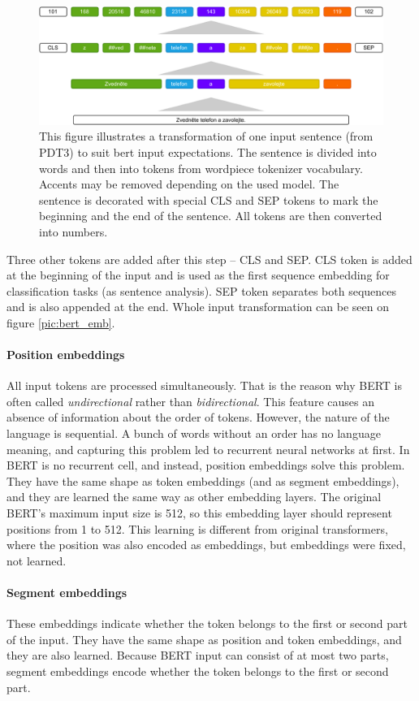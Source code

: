 \begin{figure}[ht]
\centering
\includegraphics[width=1\columnwidth]{../img/bert_input}
\protect\caption{This figure illustrates a transformation of one input sentence (from PDT3) to suit bert input expectations. The sentence is divided into words and then into tokens from wordpiece tokenizer vocabulary. Accents may be removed depending on the used model. The sentence is decorated with special CLS and SEP tokens to mark the beginning and the end of the sentence. All tokens are then converted into numbers. }
\label{pic:bert_inp}
\end{figure}
\par
Three other tokens are added after this step -- CLS and SEP. 
CLS token is added at the beginning of the input and is used as the first sequence embedding for classification tasks (as sentence analysis). SEP token separates both sequences and is also appended at the end. Whole input transformation can be seen on figure \ref{pic:bert_emb}.
\paragraph{Position embeddings}
All input tokens are processed simultaneously. That is the reason why BERT is often called \textit{undirectional} rather than \textit{bidirectional}. This feature causes an absence of information about the order of tokens. However, the nature of the language is sequential. A bunch of words without an order has no language meaning, and capturing this problem led to recurrent neural networks at first. In BERT is no recurrent cell, and instead, position embeddings solve this problem. They have the same shape as token embeddings (and as segment embeddings), and they are learned the same way as other embedding layers. The original BERT's maximum input size is 512, so this embedding layer should represent positions from 1 to 512. This learning is different from original transformers, where the position was also encoded as embeddings, but embeddings were fixed, not learned.
\paragraph{Segment embeddings}
These embeddings indicate whether the token belongs to the first or second part of the input. They have the same shape as position and token embeddings, and they are also learned. Because BERT input can consist of at most two parts, segment embeddings encode whether the token belongs to the first or second part.

